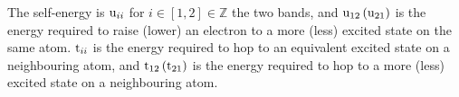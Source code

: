 \documentclass[a4paper, 12pt]{article}
\begin{document}
	The self-energy is ${\rm u}_{ii}$ for $i \in [1,2] \in \mathbb{Z}$ the two bands, and $\rm u_{12}\,(u_{21})$ is the energy required to raise (lower) an electron to a more (less) excited state on the same atom. ${\rm t}_{ii}$ is the energy required to hop to an equivalent excited state on a neighbouring atom, and $\rm t_{12}\,(t_{21})$ is the energy required to hop to a more (less) excited state on a neighbouring atom.\\
\end{document}
